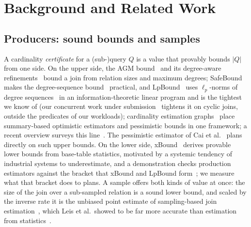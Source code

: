 \documentclass[sigconf, nonacm]{acmart}
\begin{document}
\section{Background and Related Work}
\label{sec:related}

\subsection{Producers: sound bounds and samples}
A cardinality \emph{certificate} for a (sub-)query $Q$ is a value that provably
bounds $|Q|$ from one side. On the upper side, the AGM bound~\cite{atserias2008agm}
and its degree-aware refinements~\cite{joglekar2018degree,abokhamis2017shannon}
bound a join from
relation sizes and maximum degrees; SafeBound~\cite{deeds2023safebound} makes
the degree-sequence bound~\cite{deeds2023degree} practical, and LpBound~\cite{zhang2025lpbound} uses
$\ell_p$-norms of degree sequences~\cite{abokhamis2024lpnorm} in an
information-theoretic linear program and is the tightest we know of (our
concurrent work under submission~\cite{lee2026lphceg} tightens it on cyclic
joins, outside the predicates of our workloads);
cardinality estimation graphs~\cite{chen2022ceg} place summary-based
optimistic estimators and pessimistic bounds in one framework; a recent overview surveys this
line~\cite{abokhamis2025pessimistic}. The pessimistic estimator of Cai et
al.~\cite{cai2019pessimistic} plans directly on such upper bounds. On the lower
side, xBound~\cite{stoian2026xbound} derives provable lower bounds from
base-table statistics, motivated by a systemic tendency of industrial systems
to underestimate, and a demonstration checks production estimators against
the bracket that xBound and LpBound form~\cite{stoian2026outofbounds}; we
measure what that bracket does to plans. A sample offers both kinds of value at once: the size of
the join over a sub-sampled relation is a sound lower bound, and scaled by the
inverse rate it is the unbiased point estimate of sampling-based join
estimation~\cite{li2016wanderjoin,zhao2018sampling,chen2017twolevel,leis2017sampling}, which
Leis et al.\ showed to be far more accurate than estimation from
statistics~\cite{leis2017sampling}.
\end{document}
